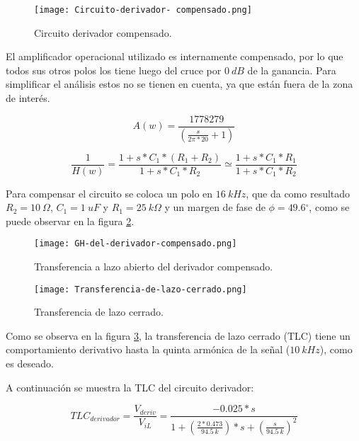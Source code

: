 \begin{figure}[H]
	\centering
	\texttt{[image: Circuito-derivador- compensado.png]}
	\caption{Circuito derivador compensado.}
	\label{fig:img_Circuito_derivador_compensado}
\end{figure}

El amplificador operacional utilizado es internamente compensado, por lo que todos sus otros polos los tiene luego del cruce por $0\:dB$ de la ganancia. Para simplificar el análisis estos no se tienen en cuenta, ya que están fuera de la zona de interés.

\begin{equation} \label{eq_Aw_1}
	A(w)=\frac{1778279}{(\frac{s}{2\pi *20}+1)}
\end{equation} 

\begin{equation} \label{eq_Aw_2}
	\frac{1}{H(w)}=\frac{1+s*C_1*(R_1+R_2)}{1+s*C_1*R_2}\simeq \frac{1+s*C_1*R_1}{1+s*C_1*R_2}
\end{equation}

Para compensar el circuito se coloca un polo en $16 \:kHz$, que da como resultado $R_2=10\:\Omega$, $C_1=1\:uF$ y $R_1=25\: k\Omega$ y un margen de fase de $\phi =49.6{}^\circ $, como se puede observar en la figura \ref{fig:img_GH del derivador compensado}.

\begin{figure}[H]
	\centering
	\texttt{[image: GH-del-derivador-compensado.png]}
	\caption{Transferencia a lazo abierto del derivador compensado.}
	\label{fig:img_GH del derivador compensado}
\end{figure}

\begin{figure}[H]
	\centering
	\texttt{[image: Transferencia-de-lazo-cerrado.png]}
	\caption{Transferencia de lazo cerrado.}
	\label{fig:img_Transferencia-de-lazo-cerrado}
\end{figure}

Como se observa en la figura \ref{fig:img_Transferencia-de-lazo-cerrado}, la transferencia de lazo cerrado (TLC) tiene un comportamiento derivativo hasta la quinta armónica de la señal ($10 \:kHz$), como es deseado.

A continuación se muestra la TLC del circuito derivador:

\begin{equation} \label{eq_TLC_derivador}
	{TLC}_{derivador}=\frac{V_{deriv}}{V_{iL}}=\frac{-0.025*s}{1+(\frac{2*0.473}{94.5\: k})*s+(\frac{s}{94.5\:k})^2}
\end{equation} 

